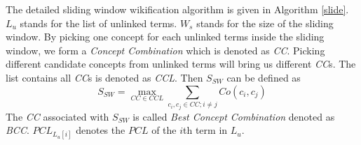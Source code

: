 The detailed sliding window wikification algorithm is given in Algorithm
\ref{slide}. $L_u$ stands for the list of unlinked terms. $W_s$ stands for the
size of the sliding window. By picking one concept for each unlinked terms inside
the sliding window, we form a \emph{Concept Combination} which is denoted
as \emph{CC}. Picking different candidate concepts from unlinked terms will
bring us different \emph{CC}s. The list contains all \emph{CC}s is denoted
as \emph{CCL}. Then $S_{SW}$ can be defined as
\[
S_{SW}=\max_{CC\in CCL}\sum_{c_i,c_j\in CC;i\neq j}{Co\left(c_i,c_j\right)}
\]
The \emph{CC} associated with $S_{SW}$ is called \emph{Best Concept Combination}
denoted as \emph{BCC}. $PCL_{L_u[i]}$ denotes the $PCL$ of the $i$th term in $L_u$.
%
%
%
%
%
